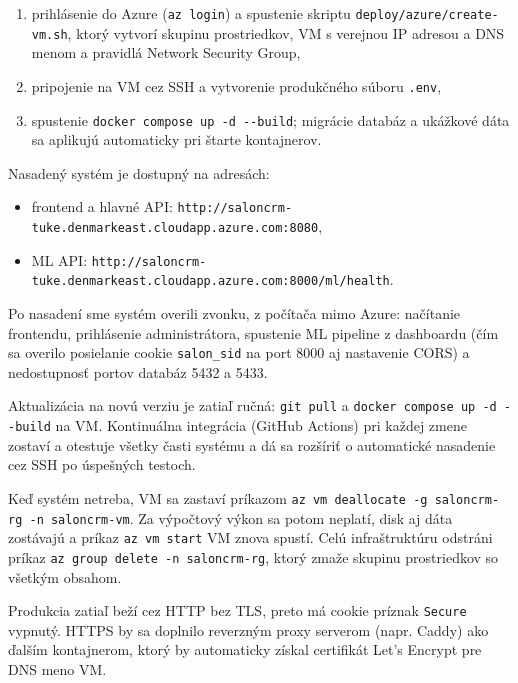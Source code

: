 \begin{enumerate}
  \item prihlásenie do Azure (\texttt{az login}) a spustenie skriptu \nolinkurl{deploy/azure/create-vm.sh}, ktorý vytvorí skupinu prostriedkov, VM s verejnou IP adresou a DNS menom a pravidlá Network Security Group,
  \item pripojenie na VM cez SSH a vytvorenie produkčného súboru \texttt{.env},
  \item spustenie \texttt{docker compose up -d -{}-build}; migrácie databáz a ukážkové dáta sa aplikujú automaticky pri štarte kontajnerov.
\end{enumerate}

Nasadený systém je dostupný na adresách:

\begin{itemize}
  \item frontend a hlavné API: \nolinkurl{http://saloncrm-tuke.denmarkeast.cloudapp.azure.com:8080},
  \item ML API: \nolinkurl{http://saloncrm-tuke.denmarkeast.cloudapp.azure.com:8000/ml/health}.
\end{itemize}

Po nasadení sme systém overili zvonku, z počítača mimo Azure: načítanie frontendu, prihlásenie administrátora, spustenie ML pipeline z dashboardu (čím sa overilo posielanie cookie \texttt{salon\_sid} na port 8000 aj nastavenie CORS) a nedostupnosť portov databáz 5432 a 5433.

Aktualizácia na novú verziu je zatiaľ ručná: \texttt{git pull} a \texttt{docker compose up -d -{}-build} na VM. Kontinuálna integrácia (GitHub Actions) pri každej zmene zostaví a otestuje všetky časti systému a dá sa rozšíriť o automatické nasadenie cez SSH po úspešných testoch.

Keď systém netreba, VM sa zastaví príkazom \texttt{az vm deallocate -g saloncrm-rg -n saloncrm-vm}. Za výpočtový výkon sa potom neplatí, disk aj dáta zostávajú a príkaz \texttt{az vm start} VM znova spustí. Celú infraštruktúru odstráni príkaz \texttt{az group delete -n saloncrm-rg}, ktorý zmaže skupinu prostriedkov so všetkým obsahom.

Produkcia zatiaľ beží cez HTTP bez TLS, preto má cookie príznak \texttt{Secure} vypnutý. HTTPS by sa doplnilo reverzným proxy serverom (napr. Caddy) ako ďalším kontajnerom, ktorý by automaticky získal certifikát Let's Encrypt pre DNS meno VM.
